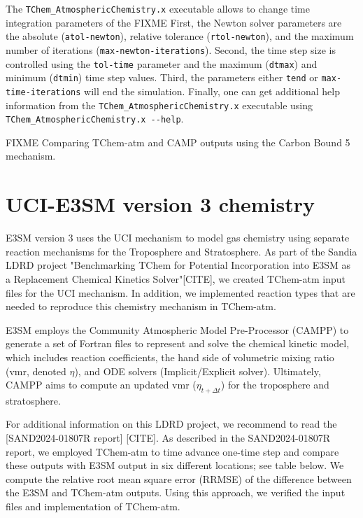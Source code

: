 \documentclass[report, 12pt]{SANDreport}
\begin{document}
The \verb|TChem_AtmosphericChemistry.x| executable allows to change time integration parameters of the 
FIXME 
 First, the Newton solver parameters are the
absolute (\verb|atol-newton|), relative tolerance (\verb|rtol-newton|), and the maximum number of iterations (\verb|max-newton-iterations|). Second, the time step size is controlled using the \verb|tol-time| parameter and the maximum (\verb|dtmax|) and minimum (\verb|dtmin|) time step values. Third, the parameters either \verb|tend| or \verb|max-time-iterations| will end the simulation. Finally, one can get additional help information from the \verb|TChem_AtmosphericChemistry.x| executable using \verb|TChem_AtmosphericChemistry.x --help|.


FIXME
Comparing TChem-atm and CAMP outputs using the Carbon Bound 5 mechanism.

\section{UCI-E3SM version 3 chemistry}

E3SM version 3 uses the UCI mechanism to model gas chemistry using separate reaction mechanisms for the Troposphere and Stratosphere. As part of the Sandia LDRD project "Benchmarking TChem for Potential Incorporation into E3SM as a Replacement Chemical Kinetics Solver"[CITE], we created TChem-atm input files for the UCI mechanism. In addition, we implemented reaction types that are needed to reproduce this chemistry mechanism in TChem-atm.

E3SM employs the Community Atmospheric Model Pre-Processor (CAMPP) to generate a set of Fortran files to represent and solve the chemical kinetic model, which includes reaction coefficients, the hand side of volumetric mixing ratio (vmr, denoted $\eta$), and ODE solvers (Implicit/Explicit solver). Ultimately, CAMPP aims to compute an updated vmr ($\eta_{t+\Delta t}$) for the troposphere and stratosphere.

For additional information on this LDRD project, we recommend to read the [SAND2024-01807R report]
[CITE]. As described in the SAND2024-01807R report, we employed TChem-atm to time advance one-time step and compare these outputs with E3SM output in six different locations; see table below. We compute the relative root mean square error (RRMSE) of the difference between the E3SM and TChem-atm outputs. Using this approach, we verified the input files and implementation of TChem-atm.
\end{document}
